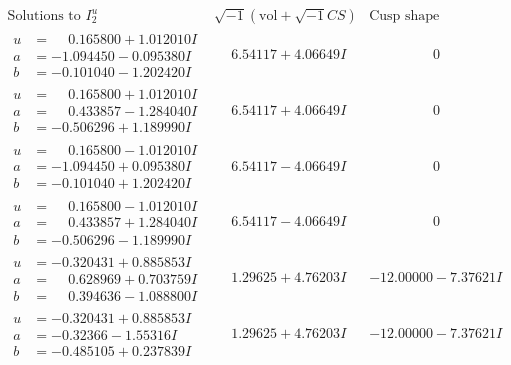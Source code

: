 \documentclass[1p]{elsarticle_modified}
\theoremstyle{definition}
\newcommand{\I}{\sqrt{-1}}
\begin{document}
$$\begin{array}{c|c|c}  
\text{Solutions to }I^u_{2}& \I (\text{vol} + \sqrt{-1}CS) & \text{Cusp shape}\\
 \hline 
\begin{aligned}
u &= \phantom{-}0.165800 + 1.012010 I \\
a &= -1.094450 - 0.095380 I \\
b &= -0.101040 - 1.202420 I\end{aligned}
 & \phantom{-}6.54117 + 4.06649 I & \phantom{-0.000000 } 0 \\ \hline\begin{aligned}
u &= \phantom{-}0.165800 + 1.012010 I \\
a &= \phantom{-}0.433857 - 1.284040 I \\
b &= -0.506296 + 1.189990 I\end{aligned}
 & \phantom{-}6.54117 + 4.06649 I & \phantom{-0.000000 } 0 \\ \hline\begin{aligned}
u &= \phantom{-}0.165800 - 1.012010 I \\
a &= -1.094450 + 0.095380 I \\
b &= -0.101040 + 1.202420 I\end{aligned}
 & \phantom{-}6.54117 - 4.06649 I & \phantom{-0.000000 } 0 \\ \hline\begin{aligned}
u &= \phantom{-}0.165800 - 1.012010 I \\
a &= \phantom{-}0.433857 + 1.284040 I \\
b &= -0.506296 - 1.189990 I\end{aligned}
 & \phantom{-}6.54117 - 4.06649 I & \phantom{-0.000000 } 0 \\ \hline\begin{aligned}
u &= -0.320431 + 0.885853 I \\
a &= \phantom{-}0.628969 + 0.703759 I \\
b &= \phantom{-}0.394636 - 1.088800 I\end{aligned}
 & \phantom{-}1.29625 + 4.76203 I & -12.00000 - 7.37621 I \\ \hline\begin{aligned}
u &= -0.320431 + 0.885853 I \\
a &= -0.32366 - 1.55316 I \\
b &= -0.485105 + 0.237839 I\end{aligned}
 & \phantom{-}1.29625 + 4.76203 I & -12.00000 - 7.37621 I \\ \hline\begin{aligned}

\end{aligned}
\end{array}$$
\end{document}
